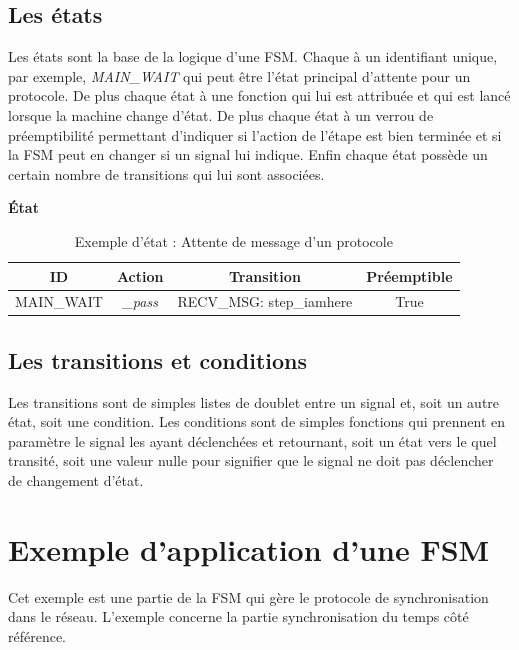 \subsection{Les états}
Les états sont la base de la logique d'une FSM. Chaque à un identifiant unique, par exemple, \textit{MAIN\_WAIT} qui peut être l'état principal d'attente pour un protocole. De plus chaque état à une fonction qui lui est attribuée et qui est lancé lorsque la machine change d'état.\p
De plus chaque état à un verrou de préemptibilité permettant d'indiquer si l'action de l'étape est bien terminée et si la FSM peut en changer si un signal lui indique.\p
Enfin chaque état possède un certain nombre de transitions qui lui sont associées.

\begin{table}[htbp]
\centering

\textbf{État}\vspace{8pt}~\\

\begin{tabularx}{0.95\textwidth}{|c|c|C|c|}
\hline
\textbf{ID} & \textbf{Action} & \textbf{Transition} & \textbf{Préemptible}  \tabularnewline
\hline
\hline
MAIN\_WAIT & \textit{\_pass} & RECV\_MSG: step\_iamhere & True \tabularnewline
\hline
\end{tabularx}
\vspace{10pt} 
\label{tab:sig_exemple}
\caption{Exemple d'état : Attente de message d'un protocole}
\end{table}

\subsection{Les transitions et conditions}

Les transitions sont de simples listes de doublet entre un signal et, soit un autre état, soit une condition.\p
Les conditions sont de simples fonctions qui prennent en paramètre le signal les ayant déclenchées et retournant, soit un état vers le quel transité, soit une valeur nulle pour signifier que le signal ne doit pas déclencher de changement d'état.

\section{Exemple d'application d'une FSM}
Cet exemple est une partie de la FSM qui gère le protocole de synchronisation dans le réseau. L'exemple concerne la partie synchronisation du temps côté référence.
